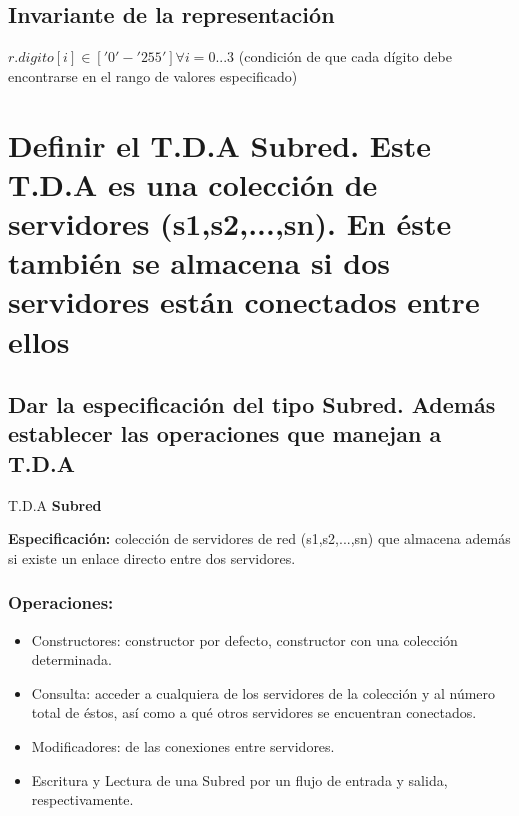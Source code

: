 \subsection{Invariante de la representación}
\begin{center}
	$ r.digito[i] \in ['0' - '255']\forall i = 0...3 $ (condición de que cada dígito debe encontrarse en el rango de valores especificado)
\end{center}

\newpage

\section{Definir el T.D.A Subred. Este T.D.A es una colección de servidores (s1,s2,...,sn). En éste también se almacena
	si dos servidores están conectados entre ellos}
\subsection{Dar la especificación del tipo Subred. Además establecer las operaciones que
	manejan a T.D.A}
T.D.A \textbf{Subred}

\textbf{Especificación:} colección de servidores de red (s1,s2,...,sn) que almacena además si existe un enlace directo entre dos servidores.

\subsubsection{Operaciones:}
\begin{itemize}
	\item Constructores: constructor por defecto, constructor con una colección determinada.
	\item Consulta: acceder a cualquiera de los servidores de la colección y al número total de éstos, así como a qué otros servidores se encuentran conectados.
	\item Modificadores: de las conexiones entre servidores.
	\item Escritura y Lectura de una Subred por un flujo de entrada y salida, respectivamente.
\end{itemize}


